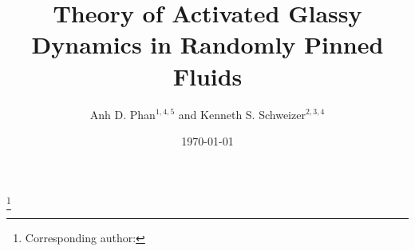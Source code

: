 \documentclass[twocolumn,showpacs,preprintnumbers,amsmath,amssymb,unsortedaddress,
]{revtex4-1}
\begin{document}
\preprint{}

\title{Theory of Activated Glassy Dynamics in Randomly Pinned Fluids}%
\thanks{Corresponding author:}%

\author{Anh D. Phan$^{1,4,5}$ and Kenneth S. Schweizer$^{2,3,4}$}


\address{Institute of Physics$^5$, Vietnam Academy of Science and Technology, 10 Dao Tan, Hanoi, Vietnam}


\date{\today}%
\end{document}
